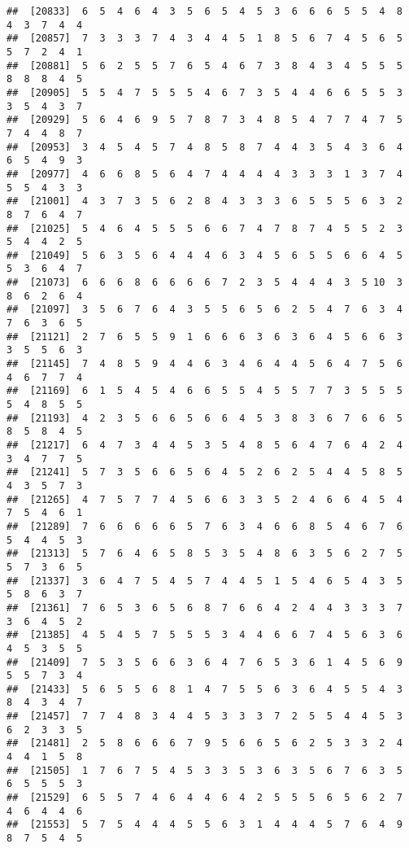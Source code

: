 \documentclass[
]{book}
\begin{document}
\begin{verbatim}
##  [20833]  6  5  4  6  4  3  5  6  5  4  5  3  6  6  6  5  5  4  8  4  3  7  4  4
##  [20857]  7  3  3  3  7  4  3  4  4  5  1  8  5  6  7  4  5  6  5  5  7  2  4  1
##  [20881]  5  6  2  5  5  7  6  5  4  6  7  3  8  4  3  4  5  5  5  8  8  8  4  5
##  [20905]  5  5  4  7  5  5  5  4  6  7  3  5  4  4  6  6  5  5  3  3  5  4  3  7
##  [20929]  5  6  4  6  9  5  7  8  7  3  4  8  5  4  7  7  4  7  5  7  4  4  8  7
##  [20953]  3  4  5  4  5  7  4  8  5  8  7  4  4  3  5  4  3  6  4  6  5  4  9  3
##  [20977]  4  6  6  8  5  6  4  7  4  4  4  4  3  3  3  1  3  7  4  5  5  4  3  3
##  [21001]  4  3  7  3  5  6  2  8  4  3  3  3  6  5  5  5  6  3  2  8  7  6  4  7
##  [21025]  5  4  6  4  5  5  5  6  6  7  4  7  8  7  4  5  5  2  3  5  4  4  2  5
##  [21049]  5  6  3  5  6  4  4  4  6  3  4  5  6  5  5  6  6  4  5  5  3  6  4  7
##  [21073]  6  6  6  8  6  6  6  6  7  2  3  5  4  4  4  3  5 10  3  8  6  2  6  4
##  [21097]  3  5  6  7  6  4  3  5  5  6  5  6  2  5  4  7  6  3  4  7  6  3  6  5
##  [21121]  2  7  6  5  5  9  1  6  6  6  3  6  3  6  4  5  6  6  3  3  5  5  6  3
##  [21145]  7  4  8  5  9  4  4  6  3  4  6  4  4  5  6  4  7  5  6  4  6  7  7  4
##  [21169]  6  1  5  4  5  4  6  6  5  5  4  5  5  7  7  3  5  5  5  5  4  8  5  5
##  [21193]  4  2  3  5  6  6  5  6  6  4  5  3  8  3  6  7  6  6  5  8  5  8  4  5
##  [21217]  6  4  7  3  4  4  5  3  5  4  8  5  6  4  7  6  4  2  4  3  4  7  7  5
##  [21241]  5  7  3  5  6  6  5  6  4  5  2  6  2  5  4  4  5  8  5  4  3  5  7  3
##  [21265]  4  7  5  7  7  4  5  6  6  3  3  5  2  4  6  6  4  5  4  7  5  4  6  1
##  [21289]  7  6  6  6  6  6  5  7  6  3  4  6  6  8  5  4  6  7  6  5  4  4  5  3
##  [21313]  5  7  6  4  6  5  8  5  3  5  4  8  6  3  5  6  2  7  5  5  7  3  6  5
##  [21337]  3  6  4  7  5  4  5  7  4  4  5  1  5  4  6  5  4  3  5  5  8  6  3  7
##  [21361]  7  6  5  3  6  5  6  8  7  6  6  4  2  4  4  3  3  3  7  3  6  4  5  2
##  [21385]  4  5  4  5  7  5  5  5  3  4  4  6  6  7  4  5  6  3  6  4  5  3  5  5
##  [21409]  7  5  3  5  6  6  3  6  4  7  6  5  3  6  1  4  5  6  9  5  5  7  3  4
##  [21433]  5  6  5  5  6  8  1  4  7  5  5  6  3  6  4  5  5  4  3  8  4  3  4  7
##  [21457]  7  7  4  8  3  4  4  5  3  3  3  7  2  5  5  4  4  5  3  6  2  3  3  5
##  [21481]  2  5  8  6  6  6  7  9  5  6  6  5  6  2  5  3  3  2  4  4  4  1  5  8
##  [21505]  1  7  6  7  5  4  5  3  3  5  3  6  3  5  6  7  6  3  5  6  5  5  5  3
##  [21529]  6  5  5  7  4  6  4  4  6  4  2  5  5  5  6  5  6  2  7  4  6  4  4  6
##  [21553]  5  7  5  4  4  4  5  5  6  3  1  4  4  4  5  7  6  4  9  8  7  5  4  5

\end{verbatim}
\end{document}
